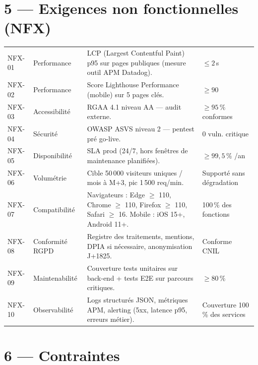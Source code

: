 \documentclass[11pt,a4paper,oneside]{report}
\begin{document}
\section*{5 --- Exigences non fonctionnelles (NFX)}

\renewcommand{\arraystretch}{1.3}
\begin{tabularx}{\textwidth}{C{1.2cm} L{2.8cm} Y C{3cm}}
\toprule
{} &  &  &  \\
\midrule
NFX-01 & Performance       & LCP (Largest Contentful Paint) p95 sur pages publiques (mesure outil APM Datadog). & $\leq 2\,$s \\
NFX-02 & Performance       & Score Lighthouse Performance (mobile) sur 5 pages clés. & $\geq 90$ \\
NFX-03 & Accessibilité     & RGAA 4.1 niveau AA --- audit externe. & $\geq 95\,\%$ conformes \\
NFX-04 & Sécurité          & OWASP ASVS niveau 2 --- pentest pré go-live. & 0 vuln. critique \\
NFX-05 & Disponibilité     & SLA prod (24/7, hors fenêtres de maintenance planifiées). & $\geq 99,5\,\%$ /an \\
NFX-06 & Volumétrie        & Cible 50\,000 visiteurs uniques / mois à M+3, pic 1\,500 req/min. & Supporté sans dégradation \\
NFX-07 & Compatibilité     & Navigateurs : Edge $\geq$ 110, Chrome $\geq$ 110, Firefox $\geq$ 110, Safari $\geq$ 16. Mobile : iOS 15+, Android 11+. & 100\,\% des fonctions \\
NFX-08 & Conformité RGPD   & Registre des traitements, mentions, DPIA si nécessaire, anonymisation J+1825. & Conforme CNIL \\
NFX-09 & Maintenabilité    & Couverture tests unitaires sur back-end + tests E2E sur parcours critiques. & $\geq 80\,\%$ \\
NFX-10 & Observabilité     & Logs structurés JSON, métriques APM, alerting (5xx, latence p95, erreurs métier). & Couverture 100\,\% des services \\
\bottomrule
\end{tabularx}

\section*{6 --- Contraintes}
\end{document}
